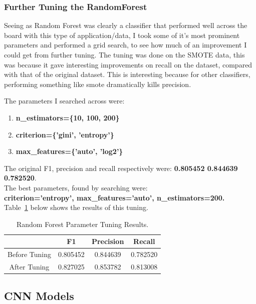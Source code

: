 \documentclass[12pt,a4paper,twoside]{report}
\begin{document}
\subsubsection{Further Tuning the RandomForest }
Seeing as Random Forest was clearly a classifier that performed well across the board with this type of application/data, I took some of it's most prominent parameters and performed a grid search, to see how much of an improvement I could get from further tuning. The tuning was done on the SMOTE data, this was because it gave interesting improvements on recall on the dataset, compared with that of the original dataset. This is interesting because for other classifiers, performing something like smote dramatically kills precision. 

The parameters I searched across were: \\
\begin{enumerate}
\item \textbf{n\_estimators=\{10, 100, 200\}}
\item \textbf{criterion=\{'gini', 'entropy'\}}
\item \textbf{max\_features=\{'auto', 'log2'\}}
\end{enumerate}

The original F1, precision and recall respectively were: \textbf{0.805452   0.844639  0.782520}.\\
The best parameters, found by searching were:\\
\textbf{criterion='entropy', max\_features='auto', n\_estimators=200.}\\

Table~\ref{table:rf-tuning} below shows the results of this tuning.


\begin{table}[H]  
  \centering
  \begin{tabular}{cccc}
    \toprule
           		& F1 & Precision & Recall \\ \midrule
    Before Tuning & 0.805452  & 0.844639  & 0.782520  \\
    After Tuning & 0.827025 & 0.853782 & 0.813008  \\
   \bottomrule
 \end{tabular}
 \caption{Random Forest Parameter Tuning Results.}
\label{table:rf-tuning}
\end{table}


\subsection{CNN Models}
\end{document}

